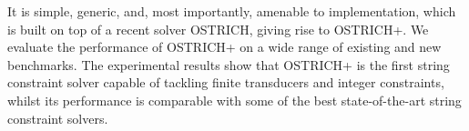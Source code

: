 It is simple, generic, and, most importantly, amenable to implementation, which 
is built on top of a recent solver OSTRICH,
giving rise to OSTRICH+.
We evaluate the performance of OSTRICH+ on  a wide range of existing and new benchmarks. The experimental results show that OSTRICH+ is the first string constraint solver capable of tackling finite transducers and integer constraints, whilst
its performance is comparable with some of the best state-of-the-art string constraint solvers.
